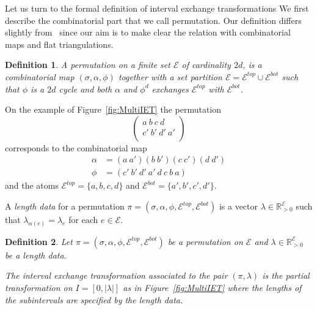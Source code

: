 \documentclass{article}
\def\RR{\mathbb{R}}
\def\cA{\mathcal{A}}
\def\cE{\mathcal{E}}
\newtheorem{definition}{Definition}
\newtheorem{remark}[definition]{Remark}
\begin{document}
Let us turn to the formal definition of interval exchange transformations
We first describe the combinatorial part that we call permutation. Our definition
differs slightly from~\cite{Yoccoz} since our aim is to make clear the relation
with combinatorial maps and flat triangulations.
\begin{definition}
A \emph{permutation} on a finite set $\cE$ of cardinality $2d$, is a combinatorial
map $(\sigma, \alpha, \phi)$ together with a set partition $\cE = \cE^{top} \cup \cE^{bot}$
such that $\phi$ is a $2d$ cycle and both $\alpha$ and $\phi^d$ exchanges
$\cE^{top}$ with $\cE^{bot}$.
\end{definition}
On the example of Figure~\ref{fig:MultiIET} the permutation
\[
\left(\begin{array}{c}
a\ b\ c\ d \\
c'\ b'\ d'\ a' \\
\end{array} \right)
\]
corresponds to the combinatorial map
\begin{align*}
\alpha &= (a\ a')(b\ b')(c\ c')(d\ d') \\
\phi &= (c'\ b'\ d'\ a'\ d\ c\ b\ a)
\end{align*}
and the atoms $\cE^{top} = \{a,b,c,d\}$ and $\cE^{bot} = \{a',b',c',d'\}$.

A \emph{length data} for a permutation $\pi = (\sigma, \alpha, \phi, \cE^{top}, \cE^{bot})$
is a vector $\lambda \in \RR_{>0}^\cE$ such that $\lambda_{\alpha(e)} = \lambda_e$ for each
$e \in \cE$.

\begin{definition}
Let $\pi = (\sigma, \alpha, \phi, \cE^{top}, \cE^{bot})$ be a permutation
on $\cE$ and $\lambda \in \RR_{>0}^\cE$ be a length data.

The \emph{interval exchange transformation} associated to the pair $(\pi,\lambda)$
is the partial transformation on $I = [0, |\lambda|]$
as in Figure~\ref{fig:MultiIET} where the lengths of the subintervals are specified
by the length data.
\end{definition}

\end{document}
